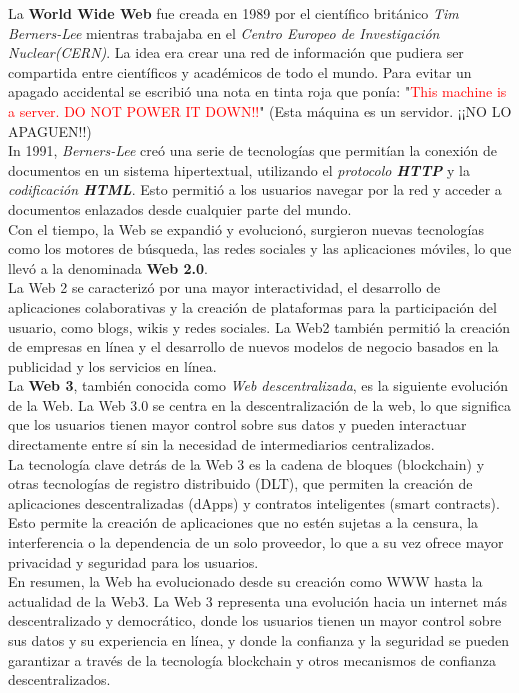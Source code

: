 La \textbf{World Wide Web} fue creada en 1989 por el científico británico 
\textit{Tim Berners-Lee} mientras trabajaba en el \textit{Centro Europeo de Investigación 
Nuclear(CERN)}. La idea era crear una red de información que pudiera ser compartida 
entre científicos y académicos de todo el mundo. Para evitar un apagado accidental se escribió 
una nota en tinta roja que ponía: "\textcolor{red}{This machine is a server. DO NOT 
POWER IT DOWN!!}"\cite{cernWeb1} (Esta máquina es un servidor. ¡¡NO LO APAGUEN!!) \\
\hfill \break
In 1991, \textit{Berners-Lee} creó una serie de tecnologías que permitían la 
conexión de documentos en un sistema hipertextual, utilizando el 
\textit{protocolo \textbf{HTTP}} y la \textit{codificación \textbf{HTML}}. 
Esto permitió a los usuarios navegar por la red y acceder a documentos 
enlazados desde cualquier parte del mundo. \\
\hfill \break
Con el tiempo, la Web se expandió y evolucionó, surgieron nuevas tecnologías como los 
motores de búsqueda, las redes sociales y las aplicaciones móviles, lo que llevó
a la denominada \textbf{Web 2.0}.\\
\hfill \break
La Web 2 se caracterizó por una mayor interactividad, el desarrollo de 
aplicaciones colaborativas y la creación de plataformas para la participación 
del usuario, como blogs, wikis y redes sociales. La Web2 también permitió la 
creación de empresas en línea y el desarrollo de nuevos modelos de negocio basados 
en la publicidad y los servicios en línea.\cite{web2Explained}\\
\hfill \break
La \textbf{Web 3}, también conocida como \textit{Web descentralizada}, 
es la siguiente evolución de la Web. La Web 3.0 se centra en la descentralización 
de la web, lo que significa que los usuarios tienen mayor control sobre sus 
datos y pueden interactuar directamente entre sí sin la necesidad de 
intermediarios centralizados.\\
\hfill \break
La tecnología clave detrás de la Web 3 es la cadena de bloques (blockchain) y 
otras tecnologías de registro distribuido (DLT), que permiten la creación de 
aplicaciones descentralizadas (dApps) y contratos inteligentes (smart contracts). 
Esto permite la creación de aplicaciones que no estén sujetas a la censura, la 
interferencia o la dependencia de un solo proveedor, lo que a su vez ofrece 
mayor privacidad y seguridad para los usuarios.\\
\hfill \break
En resumen, la Web ha evolucionado desde su creación como WWW hasta la 
actualidad de la Web3. La Web 3 representa una evolución hacia un internet 
más descentralizado y democrático, donde los usuarios tienen un mayor control 
sobre sus datos y su experiencia en línea, y donde la confianza y la seguridad 
se pueden garantizar a través de la tecnología blockchain y otros mecanismos 
de confianza descentralizados.\cite{IEEEweb3Explained}\\